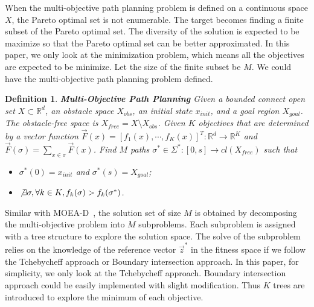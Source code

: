 \documentclass[conference]{IEEEtran}
\newtheorem{defn}{Definition}
\begin{document}
When the multi-objective path planning problem is defined on a continuous space $ X $, the Pareto optimal set is not enumerable.
The target becomes finding a finite subset of the Pareto optimal set.
The diversity of the solution is expected to be maximize so that the Pareto optimal set can be better approximated.
In this paper, we only look at the minimization problem, which means all the objectives are expected to be minimize.
Let the size of the finite subset be $ M $.
We could have the multi-objective path planning problem defined.
\begin{defn}{ \textbf{Multi-Objective Path Planning} }
Given a bounded connect open set $ X \subset \mathbb{R}^{d} $, an obstacle space $ X_{obs} $, an initial state $ x_{init} $, and a goal region $ X_{goal} $.
The obstacle-free space is $ X_{free} = X \setminus X_{obs} $.
Given $ K $ objectives that are determined by a vector function
$ \vec{F}(x) = [ f_{1} (x), \cdots , f_{K}(x) ]^{T} : \mathbb{R}^{d} \rightarrow \mathbb{R}^{K} $ and 
$ \vec{F}(\sigma) = \sum_{x \in \sigma} \vec{F}(x) $.
Find $ M $ paths $ \sigma^{*} \in \Sigma^{*}  : [0, s] \rightarrow cl(  X_{free} ) $ such that
\begin{itemize}
	\item $ \sigma^{*} (0) = x_{init} $ and $ \sigma^{*} (s) = X_{goal}  $;
	\item $ \not \exists \sigma , \forall k \in K, f_{k} (\sigma) > f_{k} (\sigma^{*}) $.
\end{itemize}
\end{defn}

Similar with MOEA-D~\cite{4358754}, the solution set of size $ M $ is obtained by decomposing the multi-objective problem into $ M $ subproblems.
Each subproblem is assigned with a tree structure to explore the solution space.
The solve of the subproblem relies on the knowledge of the reference vector $ \vec{z}^{*} $ in the fitness space if we follow the Tchebycheff approach or Boundary intersection approach.
In this paper, for simplicity, we only look at the Tchebycheff approach.
Boundary intersection approach could be easily implemented with slight modification.
Thus $ K $ trees are introduced to explore the minimum of each objective.
\end{document}
